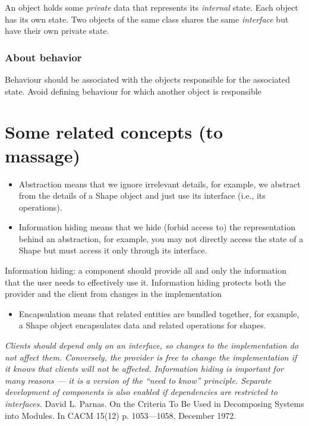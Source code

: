 \documentclass[10pt,twoside,english]{_support/latex/sbabook/sbabook}
\begin{document}
\begin{important}
An object holds some \textit{private} data that represents its \textit{internal} state. Each object has its own state. Two objects of the same class shares the same \textit{interface} but have their own private state.
\end{important}
\subsubsection{About behavior}
Behaviour should be associated with the objects responsible for the associated state.
Avoid defining behaviour for which another object is responsible
\section{Some related concepts (to massage)}
\begin{itemize}
\item Abstraction means that we ignore irrelevant details, for example, we abstract from the details of a Shape object and just use its interface (i.e., its operations).
\item Information hiding means that we hide (forbid access to) the representation behind an abstraction, for example, you may not directly access the state of a Shape but must access it only through its interface.
\end{itemize}

 Information hiding: a component should provide all and only the information that the user needs to effectively use it.
Information hiding protects both the provider and the client from changes in the implementation

\begin{itemize}
\item Encapsulation means that related entities are bundled together, for example, a Shape object encapsulates data and related operations for shapes.
\end{itemize}

\textit{Clients should depend only on an interface, so changes to the implementation do not affect them.
Conversely, the provider is free to change the implementation if it knows that clients will not be affected.
Information hiding is important for many reasons — it is a version of the “need to know” principle.
Separate development of components is also enabled if dependencies are restricted to interfaces.}
David L. Parnas. On the Criteria To Be Used in Decomposing Systems into Modules. In CACM 15(12) p. 1053—1058, December 1972.
\end{document}
